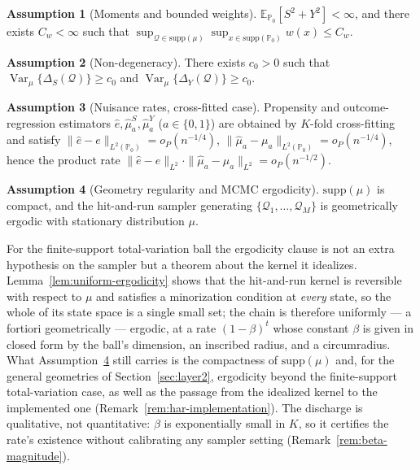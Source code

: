 \documentclass[11pt]{article}
\theoremstyle{plain}
\theoremstyle{definition}
\newtheorem{assumption}{Assumption}
\theoremstyle{remark}
\newcommand{\E}{\mathbb{E}}
\newcommand{\PP}{\mathbb{P}}
\newcommand{\Q}{\mathcal{Q}}
\newcommand{\ehat}{\widehat{e}}
\DeclareMathOperator{\Var}{Var}
\begin{document}
\begin{assumption}[Moments and bounded weights]\label{ass:moments}
$\E_{\PP_0}[S^2+Y^2]<\infty$, and there exists $C_w<\infty$ such that
$\sup_{\Q\in\mathrm{supp}(\mu)}\sup_{x\in\mathrm{supp}(\PP_0)} w(x)\le C_w$.
\end{assumption}

\begin{assumption}[Non-degeneracy]\label{ass:nondegeneracy}
There exists $c_0>0$ such that $\Var_\mu\{\Delta_S(\Q)\}\ge c_0$ and
$\Var_\mu\{\Delta_Y(\Q)\}\ge c_0$.
\end{assumption}

\begin{assumption}[Nuisance rates, cross-fitted case]\label{ass:nuisance}
Propensity and outcome-regression estimators $\ehat,\hat\mu_a^S,\hat\mu_a^Y$ ($a\in\{0,1\}$)
are obtained by $K$-fold cross-fitting and satisfy
$\|\ehat-e\|_{L^2(\PP_0)}=o_P(n^{-1/4})$,
$\|\hat\mu_a-\mu_a\|_{L^2(\PP_0)}=o_P(n^{-1/4})$, hence the product rate
$\|\ehat-e\|_{L^2}\cdot\|\hat\mu_a-\mu_a\|_{L^2}=o_P(n^{-1/2})$.
\end{assumption}

\begin{assumption}[Geometry regularity and MCMC ergodicity]\label{ass:geometry}
$\mathrm{supp}(\mu)$ is compact, and the hit-and-run sampler generating
$\{\Q_1,\dots,\Q_M\}$ is geometrically ergodic with stationary distribution $\mu$.
\end{assumption}

For the finite-support total-variation ball the ergodicity clause is not an extra
hypothesis on the sampler but a theorem about the kernel it idealizes.
Lemma~\ref{lem:uniform-ergodicity} shows that the hit-and-run kernel is reversible with
respect to $\mu$ and satisfies a minorization condition at \emph{every} state, so the
whole of its state space is a single small set; the chain is therefore uniformly --- a
fortiori geometrically --- ergodic, at a rate $(1-\beta)^t$ whose constant $\beta$ is
given in closed form by the ball's dimension, an inscribed radius, and a circumradius.
What Assumption~\ref{ass:geometry} still carries is the compactness of
$\mathrm{supp}(\mu)$ and, for the general geometries of Section~\ref{sec:layer2},
ergodicity beyond the finite-support total-variation case, as well as the passage from
the idealized kernel to the implemented one (Remark~\ref{rem:har-implementation}). The discharge is
qualitative, not quantitative: $\beta$ is exponentially small in $K$, so it certifies
the rate's existence without calibrating any sampler setting
(Remark~\ref{rem:beta-magnitude}).
\end{document}
